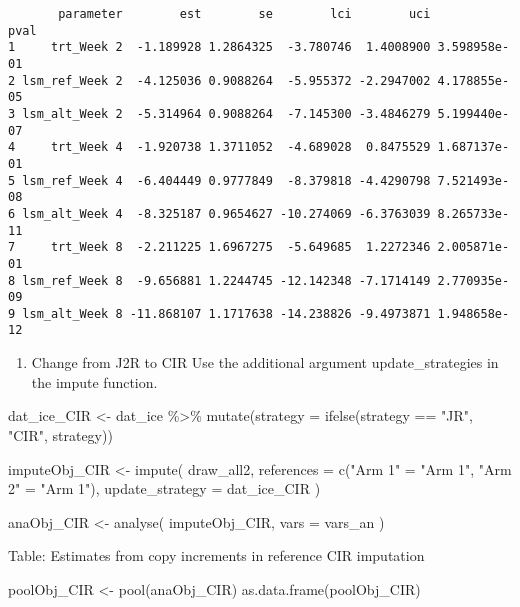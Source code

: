 \documentclass[
  letterpaper,
  DIV=11,
  numbers=noendperiod]{scrreprt}
\newenvironment{Shaded}{\begin{snugshade}}{\end{snugshade}}
\newcommand{\AttributeTok}[1]{\textcolor[rgb]{0.40,0.45,0.13}{#1}}
\newcommand{\FunctionTok}[1]{\textcolor[rgb]{0.28,0.35,0.67}{#1}}
\newcommand{\NormalTok}[1]{\textcolor[rgb]{0.00,0.23,0.31}{#1}}
\newcommand{\OtherTok}[1]{\textcolor[rgb]{0.00,0.23,0.31}{#1}}
\newcommand{\SpecialCharTok}[1]{\textcolor[rgb]{0.37,0.37,0.37}{#1}}
\newcommand{\StringTok}[1]{\textcolor[rgb]{0.13,0.47,0.30}{#1}}
\providecommand{\tightlist}{%
  \setlength{\itemsep}{0pt}\setlength{\parskip}{0pt}}\usepackage{longtable,booktabs,array}
\begin{document}
\begin{verbatim}
       parameter        est        se        lci        uci         pval
1     trt_Week 2  -1.189928 1.2864325  -3.780746  1.4008900 3.598958e-01
2 lsm_ref_Week 2  -4.125036 0.9088264  -5.955372 -2.2947002 4.178855e-05
3 lsm_alt_Week 2  -5.314964 0.9088264  -7.145300 -3.4846279 5.199440e-07
4     trt_Week 4  -1.920738 1.3711052  -4.689028  0.8475529 1.687137e-01
5 lsm_ref_Week 4  -6.404449 0.9777849  -8.379818 -4.4290798 7.521493e-08
6 lsm_alt_Week 4  -8.325187 0.9654627 -10.274069 -6.3763039 8.265733e-11
7     trt_Week 8  -2.211225 1.6967275  -5.649685  1.2272346 2.005871e-01
8 lsm_ref_Week 8  -9.656881 1.2244745 -12.142348 -7.1714149 2.770935e-09
9 lsm_alt_Week 8 -11.868107 1.1717638 -14.238826 -9.4973871 1.948658e-12
\end{verbatim}

\begin{enumerate}
\def\labelenumi{\arabic{enumi}.}
\setcounter{enumi}{4}
\tightlist
\item
  Change from J2R to CIR Use the additional argument update\_strategies
  in the impute function.
\end{enumerate}

\begin{Shaded}
\begin{Highlighting}[]
\NormalTok{dat\_ice\_CIR }\OtherTok{\textless{}{-}}\NormalTok{ dat\_ice }\SpecialCharTok{\%\textgreater{}\%} 
  \FunctionTok{mutate}\NormalTok{(}\AttributeTok{strategy =} \FunctionTok{ifelse}\NormalTok{(strategy }\SpecialCharTok{==} \StringTok{"JR"}\NormalTok{, }\StringTok{"CIR"}\NormalTok{, strategy))}

\NormalTok{imputeObj\_CIR }\OtherTok{\textless{}{-}} \FunctionTok{impute}\NormalTok{(}
\NormalTok{  draw\_all2,}
  \AttributeTok{references =} \FunctionTok{c}\NormalTok{(}\StringTok{"Arm 1"} \OtherTok{=} \StringTok{"Arm 1"}\NormalTok{, }\StringTok{"Arm 2"} \OtherTok{=} \StringTok{"Arm 1"}\NormalTok{),}
  \AttributeTok{update\_strategy =}\NormalTok{ dat\_ice\_CIR}
\NormalTok{)}

\NormalTok{anaObj\_CIR }\OtherTok{\textless{}{-}} \FunctionTok{analyse}\NormalTok{(}
\NormalTok{  imputeObj\_CIR,}
  \AttributeTok{vars =}\NormalTok{ vars\_an}
\NormalTok{)}
\end{Highlighting}
\end{Shaded}

Table: Estimates from copy increments in reference CIR imputation

\begin{Shaded}
\begin{Highlighting}[]
\NormalTok{poolObj\_CIR }\OtherTok{\textless{}{-}} \FunctionTok{pool}\NormalTok{(anaObj\_CIR)}
\FunctionTok{as.data.frame}\NormalTok{(poolObj\_CIR)}
\end{Highlighting}
\end{Shaded}
\end{document}
